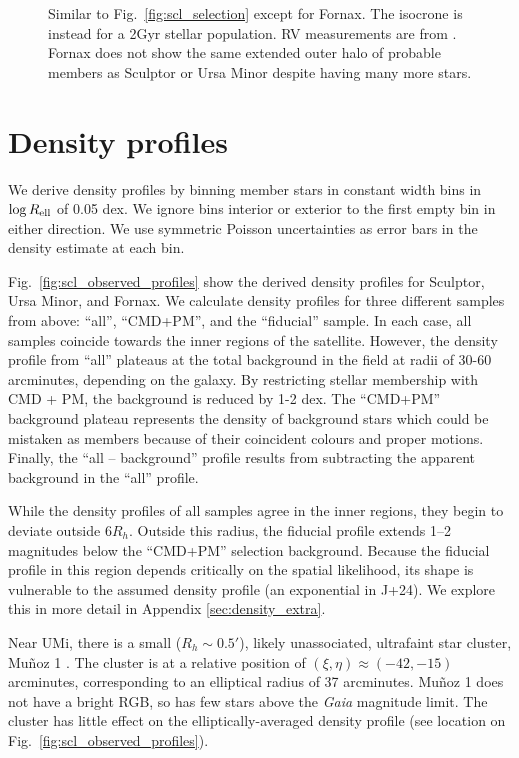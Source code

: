 \begin{figure}
\centering
{}
\caption[Fornax sample selection]{Similar to
Fig.~\ref{fig:scl_selection} except for Fornax. The isocrone is instead
for a 2Gyr stellar population. RV measurements are from \citet{WMO2009}.
Fornax does not show the same extended outer halo of probable members as
Sculptor or Ursa Minor despite having many more
stars.}\label{fig:fornax_selection}
\end{figure}

\section{Density profiles}\label{density-profiles}

We derive density profiles by binning member stars in constant width
bins in \(\log R_{\rm ell}\) of 0.05 dex. We ignore bins interior or
exterior to the first empty bin in either direction. We use symmetric
Poisson uncertainties as error bars in the density estimate at each bin.

Fig.~\ref{fig:scl_observed_profiles} show the derived density profiles
for Sculptor, Ursa Minor, and Fornax. We calculate density profiles for
three different samples from above: ``all'', ``CMD+PM'', and the
``fiducial'' sample. In each case, all samples coincide towards the
inner regions of the satellite. However, the density profile from
``all'' plateaus at the total background in the field at radii of 30-60
arcminutes, depending on the galaxy. By restricting stellar membership
with CMD + PM, the background is reduced by 1-2 dex. The ``CMD+PM''
background plateau represents the density of background stars which
could be mistaken as members because of their coincident colours and
proper motions. Finally, the ``all -- background'' profile results from
subtracting the apparent background in the ``all'' profile.

While the density profiles of all samples agree in the inner regions,
they begin to deviate outside \(6R_h\). Outside this radius, the
fiducial profile extends 1--2 magnitudes below the ``CMD+PM'' selection
background. Because the fiducial profile in this region depends
critically on the spatial likelihood, its shape is vulnerable to the
assumed density profile (an exponential in J+24). We explore this in
more detail in Appendix \ref{sec:density_extra}.

Near UMi, there is a small (\(R_h\sim 0.5'\)), likely unassociated,
ultrafaint star cluster, Muñoz 1 \citep{munoz+2012}. The cluster is at a
relative position of \((\xi, \eta) \approx(-42, -15)\) arcminutes,
corresponding to an elliptical radius of 37 arcminutes. Muñoz 1 does not
have a bright RGB, so has few stars above the \emph{Gaia} magnitude
limit. The cluster has little effect on the elliptically-averaged
density profile (see location on Fig.~\ref{fig:scl_observed_profiles}).

